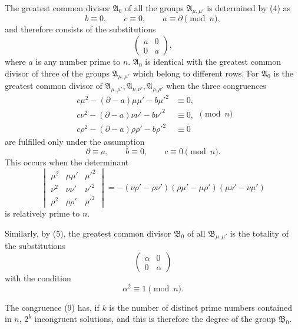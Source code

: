 \documentclass[11pt]{article}
\begin{document}
The greatest common divisor $\mathfrak A_0$ of all the groups $\mathfrak A_{\mu,\mu'}$ is
determined by (4) as
\[
 b\equiv0,
 \qquad c\equiv0,
 \qquad a\equiv\partial\pmod n,
\]
and therefore consists of the substitutions
\[
 \begin{pmatrix}a&0\\0&a\end{pmatrix},
\]
where $a$ is any number prime to $n$. $\mathfrak A_0$ is identical with the greatest common
divisor of three of the groups $\mathfrak A_{\mu,\mu'}$ which belong to different rows. For
$\mathfrak A_0$ is the greatest common divisor of
$\mathfrak A_{\mu,\mu'},\mathfrak A_{\nu,\nu'},\mathfrak A_{\rho,\rho'}$ when the three congruences
\[
\begin{aligned}
 c\mu^2-(\partial-a)\mu\mu'-b\mu'^2&\equiv0,\\
 c\nu^2-(\partial-a)\nu\nu'-b\nu'^2&\equiv0,\\
 c\rho^2-(\partial-a)\rho\rho'-b\rho'^2&\equiv0
\end{aligned}
\pmod n
\]
are fulfilled only under the assumption
\[
 \partial\equiv a,
 \qquad b\equiv0,
 \qquad c\equiv0\pmod n.
\]
This occurs when the determinant
\[
\begin{vmatrix}
 \mu^2&\mu\mu'&\mu'^2\\
 \nu^2&\nu\nu'&\nu'^2\\
 \rho^2&\rho\rho'&\rho'^2
\end{vmatrix}
=-(\nu\rho'-\rho\nu')(\rho\mu'-\mu\rho')(\mu\nu'-\nu\mu')
\]
is relatively prime to $n$.

Similarly, by (5), the greatest common divisor $\mathfrak B_0$ of all
$\mathfrak B_{\mu,\mu'}$ is the totality of the substitutions
\begin{equation}
 \begin{pmatrix}\alpha&0\\0&\alpha\end{pmatrix}
\tag{8}
\end{equation}
with the condition
\begin{equation}
 \alpha^2\equiv1\pmod n.
\tag{9}
\end{equation}

The congruence (9) has, if $k$ is the number of distinct prime numbers contained in $n$,
$2^k$ incongruent solutions, and this is therefore the degree of the group $\mathfrak B_0$.
\end{document}
